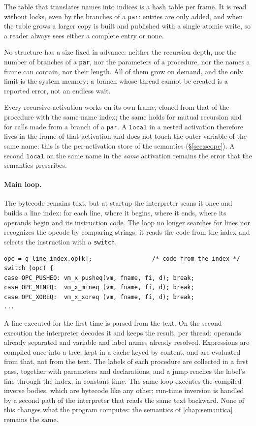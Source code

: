 The table that translates names into indices is a hash table per frame. It is read
without locks, even by the branches of a \texttt{par}: entries are only added, and
when the table grows a larger copy is built and published with a single atomic
write, so a reader always sees either a complete entry or none.

No structure has a size fixed in advance: neither the recursion depth, nor the
number of branches of a \texttt{par}, nor the parameters of a procedure, nor the
names a frame can contain, nor their length. All of them grow on demand, and the
only limit is the system memory: a branch whose thread cannot be created is a
reported error, not an endless wait.

Every recursive activation works on its own frame, cloned from that of the
procedure with the same name index; the same holds for mutual recursion
and for calls made from a branch of a \texttt{par}. A $\mathtt{local}$
in a nested activation therefore lives in the frame of that activation and does not
touch the outer variable of the same name: this is the per-activation store of the
semantics (\S\ref{sec:scope}). A second $\mathtt{local}$ on the same name in the
\emph{same} activation remains the error that the semantics prescribes.

\paragraph{Main loop.} The bytecode remains text, but at startup
the interpreter scans it once and builds a line index: for
each line, where it begins, where it ends, where its operands begin and its
instruction code. The loop no longer searches for lines nor recognizes the opcode
by comparing strings: it reads the code from the index and selects the instruction
with a \texttt{switch}.

\begin{lstlisting}
opc = g_line_index.op[k];                 /* code from the index */
switch (opc) {
case OPC_PUSHEQ: vm_x_pusheq(vm, fname, fi, d); break;
case OPC_MINEQ:  vm_x_mineq (vm, fname, fi, d); break;
case OPC_XOREQ:  vm_x_xoreq (vm, fname, fi, d); break;
...
\end{lstlisting}

\noindent
A line executed for the first time is parsed from the text. On the second
execution the interpreter decodes it and keeps the result, per thread:
operands already separated and variable and label names already resolved. Expressions
are compiled once into a tree, kept in a cache keyed by content, and are evaluated
from that, not from the text. The labels of each procedure are collected in a first
pass, together with parameters and declarations, and a jump reaches the label's line
through the index, in constant time. The same loop executes the compiled inverse
bodies, which are bytecode like any other; run-time inversion is handled by a second
path of the interpreter that reads the same text backward. None of this changes what
the program computes: the semantics of \cref{chap:semantica} remains the same.

